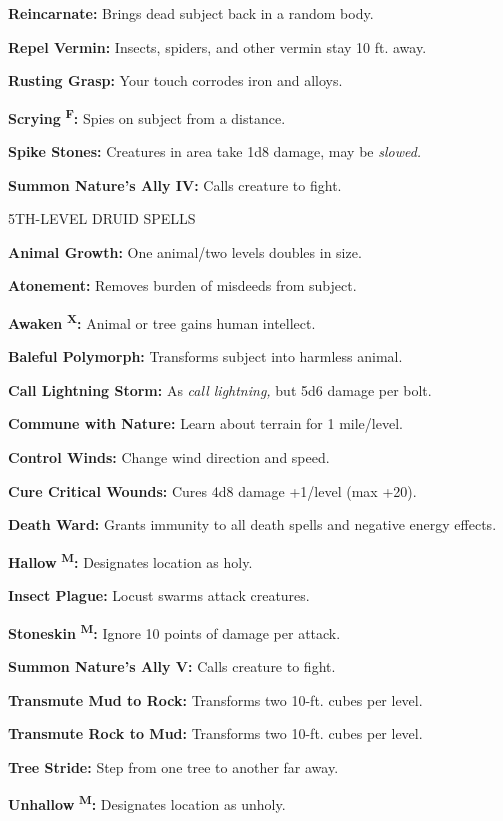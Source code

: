 \documentclass{article}
\begin{document}
\textbf{Reincarnate:} Brings dead subject back in a random body.

\textbf{Repel Vermin:} Insects, spiders, and other vermin stay 10 ft. away.

\textbf{Rusting Grasp:} Your touch corrodes iron and alloys.

\textbf{Scrying }\textsuperscript{\textbf{F}}\textbf{:} Spies on subject from a 
distance.

\textbf{Spike Stones:} Creatures in area take 1d8 damage, may be \textit{slowed.}

\textbf{Summon Nature's Ally IV:} Calls creature to fight.

5TH-LEVEL DRUID SPELLS

\textbf{Animal Growth:} One animal/two levels doubles in size.

\textbf{Atonement:} Removes burden of misdeeds from subject.

\textbf{Awaken }\textsuperscript{\textbf{X}}\textbf{:} Animal or tree gains human 
intellect.

\textbf{Baleful Polymorph:} Transforms subject into harmless animal.

\textbf{Call Lightning Storm:} As \textit{call lightning, }but 5d6 damage per bolt.

\textbf{Commune with Nature:} Learn about terrain for 1 mile/level.

\textbf{Control Winds:} Change wind direction and speed.

\textbf{Cure Critical Wounds:} Cures 4d8 damage +1/level (max +20).

\textbf{Death Ward:} Grants immunity to all death spells and negative energy effects.

\textbf{Hallow }\textsuperscript{\textbf{M}}\textbf{:} Designates location as holy.

\textbf{Insect Plague:} Locust swarms attack creatures.

\textbf{Stoneskin }\textsuperscript{\textbf{M}}\textbf{:} Ignore 10 points of damage 
per attack.

\textbf{Summon Nature's Ally V:} Calls creature to fight.

\textbf{Transmute Mud to Rock:} Transforms two 10-ft. cubes per level.

\textbf{Transmute Rock to Mud:} Transforms two 10-ft. cubes per level.

\textbf{Tree Stride:} Step from one tree to another far away.

\textbf{Unhallow }\textsuperscript{\textbf{M}}\textbf{:} Designates location as 
unholy.
\end{document}
